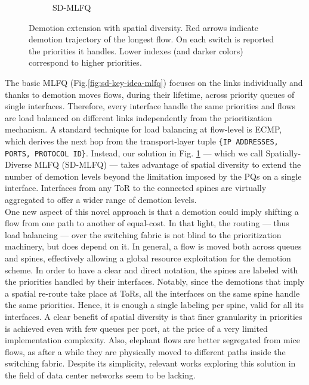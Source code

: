 \begin{figure}
\begin{subfigure}[htpb]{0.3\textwidth}
		\caption{SD-MLFQ}
		\label{fig:sd-key-idea-sdmlfq}
	\end{subfigure}
	\caption{Demotion extension with spatial diversity. Red arrows indicate demotion trajectory of the longest flow. On each switch is reported the priorities it handles. Lower indexes (and darker colors) correspond to higher priorities.}
	\label{fig:sd-key-idea}
\end{figure}
The basic MLFQ (Fig.\ref{fig:sd-key-idea-mlfq}) focuses on the links individually and thanks to demotion moves flows, during their lifetime, across priority queues of single interfaces. Therefore, every interface handle the same priorities and flows are load balanced on different links independently from the prioritization mechanism. A standard technique for load balancing at flow-level is ECMP, which derives the next hop from the transport-layer tuple \texttt{\{IP ADDRESSES, PORTS, PROTOCOL ID\}}. Instead, our solution in Fig. \ref{fig:sd-key-idea-sdmlfq} --- which we call Spatially-Diverse MLFQ (SD-MLFQ) --- takes advantage of spatial diversity to extend the number of demotion levels beyond the limitation imposed by the PQs on a single interface. Interfaces from any ToR to the connected spines are virtually aggregated to offer a wider range of demotion levels. \\
One new aspect of this novel approach is that a demotion could imply shifting a flow from one path to another of equal-cost. In that light, the routing --- thus load balancing --- over the switching fabric is not blind to the prioritization machinery, but does depend on it. In general, a flow is moved both across queues and spines, effectively allowing a global resource exploitation for the demotion scheme. In order to have a clear and direct notation, the spines are labeled with the priorities handled by their interfaces. Notably, since the demotions that imply a spatial re-route take place at ToRs, all the interfaces on the same spine handle the same priorities. Hence, it is enough a single labeling per spine, valid for all its interfaces. 
A clear benefit of spatial diversity is that finer granularity in priorities is achieved even with few queues per port, at the price of a very limited implementation complexity. Also, elephant flows are better segregated from mice flows, as after a while they are physically moved to different paths inside the switching fabric. Despite its simplicity, relevant works exploring this solution in the field of data center networks seem to be lacking. 

